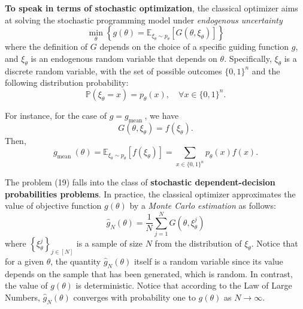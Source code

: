 \textbf{To speak in terms of stochastic optimization}, the classical optimizer aims at solving the stochastic programming model under \textit{endogenous uncertainty} 
\begin{equation*}
\min _{\theta}\left\{g(\theta)=\mathbb{E}_{\xi_{\theta} \sim p_{\theta}}\left[G\left(\theta, \xi_{\theta}\right)\right]\right\} \tag{19}
\end{equation*}
where the definition of $G$ depends on the choice of a specific guiding function $g$, and $\xi_{\theta}$ is an endogenous random variable that depends on $\theta$. Specifically, $\xi_{\theta}$ is a discrete random variable, with the set of possible outcomes $\{0,1\}^{n}$ and the following distribution probability:
$$
\mathbb{P}\left(\xi_{\theta}=x\right)=p_{\theta}(x), \quad \forall x \in\{0,1\}^{n}.
$$
\begin{example}
    For instance, for the case of $g=g_{\text {mean }}$, we have
$$
G\left(\theta, \xi_{\theta}\right)=f\left(\xi_{\theta}\right).
$$
Then, 
$$
g_{\text {mean }}(\theta)
=\mathbb{E}_{\xi_{\theta} \sim p_{\theta}}\left[f\left(\xi_{\theta}\right)\right]
=\sum_{x \in\{0,1\}^{n}} p_{\theta}(x) f(x).
$$
\end{example}


The problem (19) falls into the class of \textbf{stochastic dependent-decision probabilities problems}. %
In practice, the classical optimizer approximates the value of objective function $g(\theta)$ by a \textit{Monte Carlo estimation} as follows:
$$
\hat{g}_{N}(\theta)=\frac{1}{N} \sum_{j=1}^{N} G\left(\theta, \xi_{\theta}^{j}\right)
$$
where $\left\{\xi_{\theta}^{j}\right\}_{j \in[N]}$ is a sample of size $N$ from the distribution of $\xi_{\theta}$. Notice that for a given $\theta$, the quantity $\hat{g}_{N}(\theta)$ itself is a random variable since its value depends on the sample that has been generated, which is random. In contrast, the value of $g(\theta)$ is deterministic. Notice that according to the Law of Large Numbers, $\hat{g}_{N}(\theta)$ converges with probability one to $g(\theta)$ as $N \rightarrow \infty$.

